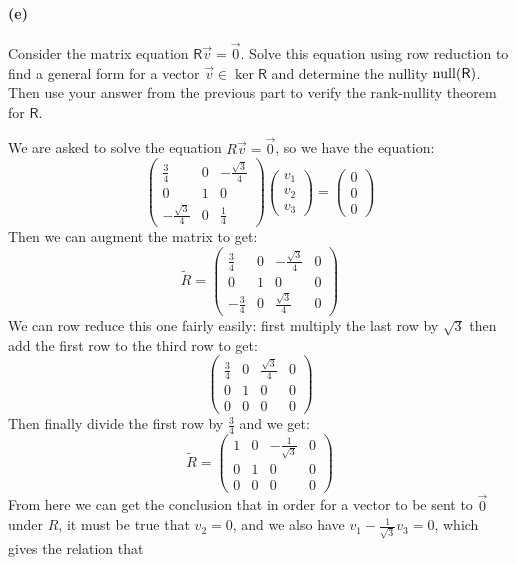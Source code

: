 \documentclass{article}
\begin{document}
\paragraph{(e)}
Consider the matrix equation $\mathsf{R}\vec{v}=\vec{0}$.  Solve this equation using row reduction to find a general form for a vector $\vec{v}\in\ker{\mathsf{R}}$ 
and determine the nullity $\operatorname{null}(\mathsf{R})$.   Then use your answer from the previous part to verify the rank-nullity theorem for $\mathsf{R}$.

\begin{solution}
	We are asked to solve the equation $R \vec v = \vec 0$, so we have the equation: 
	\[
		\begin{pmatrix} \frac{3}{4} & 0 & -\frac{\sqrt{3}}{4}\\0&1&0\\-\frac{\sqrt{3}}{4} &0& \frac{1}{4}  \end{pmatrix} \begin{pmatrix} v_1\\v_2\\v_3 \end{pmatrix}  = \begin{pmatrix} 0\\0\\0 \end{pmatrix} 
	\] 
	Then we can augment the matrix to get: 
	\[
		\tilde R = \begin{pmatrix} \frac{3}{4}&0 &-\frac{\sqrt{3}}{4}& 0\\0&1&0&0\\-\frac{3}{4}&0&\frac{\sqrt{3}}{4}&0 \end{pmatrix} 
	\] 
	We can row reduce this one fairly easily: first multiply the last row by $\sqrt{3}$ then add the first row 
	to the third row to get: 
	\[
		\begin{pmatrix} \frac{3}{4}&0 & \frac{\sqrt{3}}{4}&0\\0&1&0&0\\0&0&0&0\end{pmatrix} 
	\] 
	Then finally divide the first row by $\frac{3}{4}$ and we get:
	\[
		\tilde R = \begin{pmatrix} 1 &0&-\frac{1}{\sqrt{3} }& 0\\0&1&0&0\\0&0&0&0 \end{pmatrix} 
	\] 
	From here we can get the conclusion that in order for a vector to be sent to $\vec 0$ under $R$, it must 
	be true that $v_2 = 0$, and we also have $v_1 - \frac{1}{\sqrt{3}} v_3 = 0$, which gives the relation that 

\end{solution}
\end{document}
